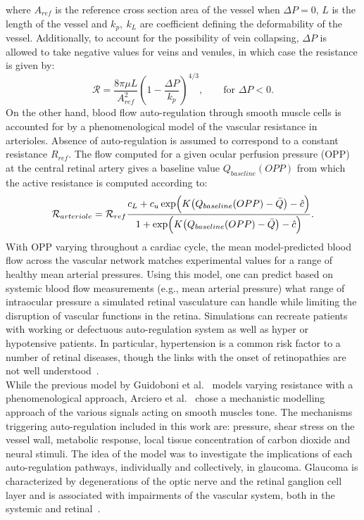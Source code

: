 \documentclass[12pt,a4paper]{article}
\begin{document}
where $A_{ref}$ is the reference cross section area of the vessel when $\Delta P = 0$, $L$ is the length of the vessel and $k_p,~k_L$ are coefficient defining the deformability of the vessel.
Additionally, to account for the possibility of vein collapsing, $\Delta P$ is allowed to take negative values for veins and venules, in which case the resistance is given by:
\begin{equation*}
  \label{eq:PassiveVariableResistanceCollapse}
  \mathcal{R} = \frac{8\pi\mu L}{A^2_{ref}}\left(1-\frac{\Delta P}{k_p}\right)^{4/3},\qquad \text{for } \Delta P<0.
\end{equation*}
On the other hand, blood flow auto-regulation through smooth muscle cells is accounted for by a phenomenological model of the vascular resistance in arterioles.
Absence of auto-regulation is assumed to correspond to a constant resistance $R_{ref}$.
The flow computed for a given ocular perfusion pressure (OPP) at the central retinal artery gives a baseline value $Q_{baseline}(OPP)$ from which the active resistance is computed according to:
\begin{equation*}
  \label{eq:ActiveResistancePhenomenological}
  \mathcal{R}_{arteriole} = \mathcal{R}_{ref}\frac{c_L + c_u\exp\Bigl(K\bigl(Q_{baseline}(OPP)-\bar Q\bigr)-\hat c\Bigr)}{1 + \exp\Bigl(K\bigl(Q_{baseline}(OPP)-\bar Q\bigr)-\hat c\Bigr)}.
\end{equation*}
With OPP varying throughout a cardiac cycle, the mean model-predicted blood flow across the vascular network matches experimental values for a range of healthy mean arterial pressures.
Using this model, one can predict based on systemic blood flow measurements (e.g., mean arterial pressure) what range of intraocular pressure a simulated retinal vasculature can handle while limiting the disruption of vascular functions in the retina.
Simulations can recreate patients with working or defectuous auto-regulation system as well as hyper or hypotensive patients.
In particular, hypertension is a common risk factor to a number of retinal diseases, though the links with the onset of retinopathies are not well understood~\cite{Klein_2004, Leeman_2019}.\\
While the previous model by Guidoboni et al.~\cite{Guidoboni_2014b} models varying resistance with a phenomenological approach, Arciero et al.~\cite{Arciero_2013} chose a mechanistic modelling approach of the various signals acting on smooth muscles tone.
The mechanisms triggering auto-regulation included in this work are: pressure, shear stress on the vessel wall, metabolic response, local tissue concentration of carbon dioxide and neural stimuli.
The idea of the model was to investigate the implications of each auto-regulation pathways, individually and collectively, in glaucoma.
Glaucoma is characterized by degenerations of the optic nerve and the retinal ganglion cell layer and is associated with impairments of the vascular system, both in the systemic and retinal~\cite{Hulsman_2007, Bonomi_2000}.
\end{document}
